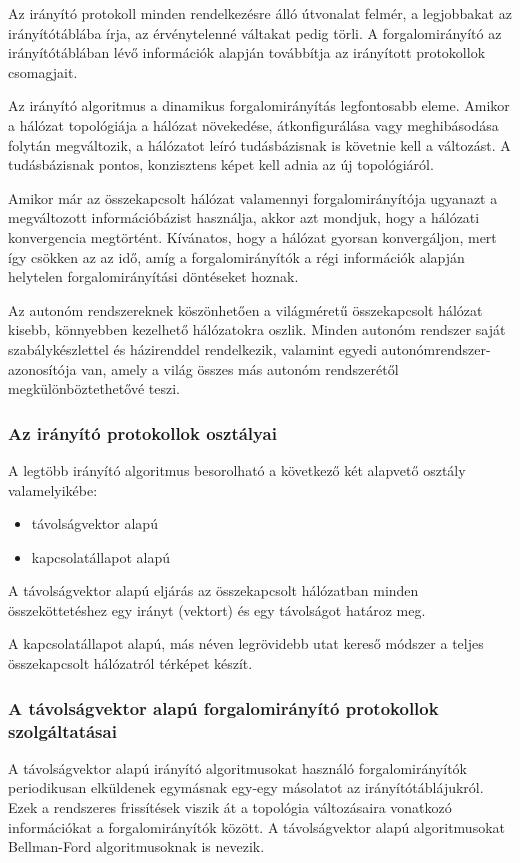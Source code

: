 Az irányító protokoll minden rendelkezésre álló útvonalat felmér, a legjobbakat az
irányítótáblába írja, az érvénytelenné váltakat pedig törli. A forgalomirányító az
irányítótáblában lévő információk alapján továbbítja az irányított protokollok csomagjait.

Az irányító algoritmus a dinamikus forgalomirányítás legfontosabb eleme. Amikor a hálózat
topológiája a hálózat növekedése, átkonfigurálása vagy meghibásodása folytán megváltozik, a
hálózatot leíró tudásbázisnak is követnie kell a változást. A tudásbázisnak pontos, konzisztens
képet kell adnia az új topológiáról.

Amikor már az összekapcsolt hálózat valamennyi forgalomirányítója ugyanazt a megváltozott
információbázist használja, akkor azt mondjuk, hogy a hálózati konvergencia megtörtént.
Kívánatos, hogy a hálózat gyorsan konvergáljon, mert így csökken az az idő, amíg a
forgalomirányítók a régi információk alapján helytelen forgalomirányítási döntéseket hoznak.

Az autonóm rendszereknek köszönhetően a világméretű összekapcsolt hálózat kisebb,
könnyebben kezelhető hálózatokra oszlik. Minden autonóm rendszer saját szabálykészlettel és
házirenddel rendelkezik, valamint egyedi autonómrendszer-azonosítója van, amely a világ
összes más autonóm rendszerétől megkülönböztethetővé teszi.

\subsubsection{Az irányító protokollok osztályai}
A legtöbb irányító algoritmus besorolható a következő két alapvető osztály valamelyikébe:
\begin{itemize}
	\item távolságvektor alapú
	\item kapcsolatállapot alapú
\end{itemize}

A távolságvektor alapú eljárás az összekapcsolt hálózatban minden összeköttetéshez egy
irányt (vektort) és egy távolságot határoz meg.

A kapcsolatállapot alapú, más néven legrövidebb utat kereső módszer a teljes összekapcsolt
hálózatról térképet készít.

\subsubsection{A távolságvektor alapú forgalomirányító protokollok szolgáltatásai}
A távolságvektor alapú irányító algoritmusokat használó forgalomirányítók periodikusan
elküldenek egymásnak egy-egy másolatot az irányítótáblájukról. Ezek a rendszeres frissítések
viszik át a topológia változásaira vonatkozó információkat a forgalomirányítók között. A
távolságvektor alapú algoritmusokat Bellman-Ford algoritmusoknak is nevezik.

